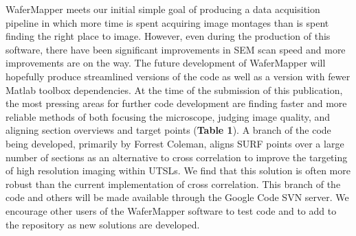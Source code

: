 \documentclass{article}
\begin{document}
WaferMapper meets our initial simple goal of producing a data acquisition pipeline in which more time is spent acquiring image montages than is spent finding the right place to image. However, even during the production of this software, there have been significant improvements in SEM scan speed and more improvements are on the way. The future development of WaferMapper will hopefully produce streamlined versions of the code as well as a version with fewer Matlab toolbox dependencies. At the time of the submission of this publication, the most pressing areas for further code development are finding faster and more reliable methods of both focusing the microscope, judging image quality, and aligning section overviews and target points (\textbf{Table 1}). A branch of the code being developed, primarily by Forrest Coleman, aligns SURF points over a large number of sections as an alternative to cross correlation to improve the targeting of high resolution imaging within UTSLs. We find that this solution is often more robust than the current implementation of cross correlation. This branch of the code and others will be made available through the Google Code SVN server. We encourage other users of the WaferMapper software to test code and to add to the repository as new solutions are developed.
\end{document}
